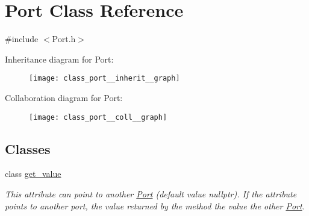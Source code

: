 \hypertarget{class_port}{}\section{Port Class Reference}
\label{class_port}


{\ttfamily \#include $<$Port.\+h$>$}



Inheritance diagram for Port\+:
\nopagebreak
\begin{figure}[H]
\begin{center}
\leavevmode
\texttt{[image: class\_port\_\_inherit\_\_graph]}
\end{center}
\end{figure}


Collaboration diagram for Port\+:
\nopagebreak
\begin{figure}[H]
\begin{center}
\leavevmode
\texttt{[image: class\_port\_\_coll\_\_graph]}
\end{center}
\end{figure}
\subsection*{Classes}
\begin{DoxyCompactItemize}
\item 
class \hyperlink{class_port_1_1get__value}{get\+\_\+value}
\begin{DoxyCompactList}\small\item\em This attribute can point to another \hyperlink{class_port}{Port} (default value nullptr). If the attribute points to another port, the value returned by the method the value the other \hyperlink{class_port}{Port}. \end{DoxyCompactList}\end{DoxyCompactItemize}
